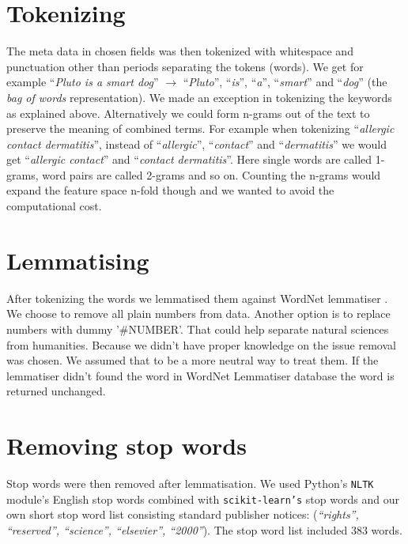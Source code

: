 \section{Tokenizing}
The meta data in chosen fields was then tokenized with whitespace 
and punctuation other than periods separating the tokens (words). 
We get for example ``\emph{Pluto is a smart dog}'' $\rightarrow$ 
``\emph{Pluto}'', ``\emph{is}'', ``\emph{a}'', ``\emph{smart}'' 
and ``\emph{dog}'' (the \emph{bag of words} representation).
We made an exception in tokenizing the keywords as explained above.
Alternatively we could form n-grams out of the text to preserve 
the meaning of combined terms. For example when tokenizing 
``\emph{allergic contact dermatitis}'', instead of 
``\emph{allergic}'', ``\emph{contact}'' and 
``\emph{dermatitis}'' we would get ``\emph{allergic contact}'' 
and ``\emph{contact dermatitis}''. Here single words are called 
1-grams, word pairs are called 2-grams and so on. Counting the 
n-grams would expand the feature space n-fold though and we wanted 
to avoid the computational cost. 

\section{Lemmatising}
After tokenizing the words we lemmatised them against WordNet 
lemmatiser \cite{noauthor_princeton_2010}.
We choose to remove all plain numbers from
data. Another option is to replace numbers with dummy '\#NUMBER'.
That could help separate natural sciences from humanities. Because 
we didn't have proper knowledge on the issue removal was chosen. 
We assumed that to be a more neutral way to treat them. 
If the lemmatiser didn't found the word in WordNet Lemmatiser 
database the word is returned unchanged. 

\section{Removing stop words}
Stop words were then removed after lemmatisation. We used Python's
\texttt{NLTK} module's English stop words combined with 
\texttt{scikit-learn's} stop words and our own short stop word 
list consisting standard publisher notices: (\emph{``rights'', 
``reserved'', ``science'', ``elsevier'', ``2000''}). The stop word 
list included $383$ words.


